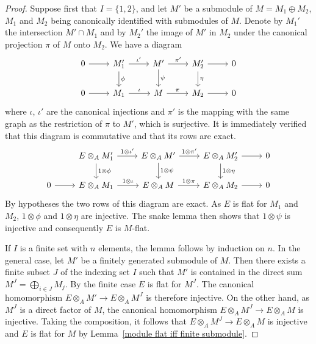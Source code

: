 \begin{proof}
Suppose first that $I=\{1,2\}$, and let $M'$ be a submodule of $M=M_1\oplus M_2$, $M_1$ and $M_2$ being canonically identified with submodules of $M$. Denote by $M_1'$ the intersection $M'\cap M_1$ and by $M_2'$ the image of $M'$ in $M_2$ under the canonical projection $\pi$ of $M$ onto $M_2$. We have a diagram
\[\begin{tikzcd}
0\ar[r]&M_1'\ar[r,"\iota'"]\ar[d,"\phi"]&M'\ar[r,"\pi'"]\ar[d,"\psi"]&M_2'\ar[r]\ar[d,"\eta"]&0\\
0\ar[r]&M_1\ar[r,"\iota"]&M\ar[r,"\pi"]&M_2\ar[r]&0
\end{tikzcd}\]
where $\iota$, $\iota'$ are the canonical injections and $\pi'$ is the mapping with the same graph as the restriction of $\pi$ to $M'$, which is surjective. It is immediately verified that this diagram is commutative and that its rows are exact.
\[\begin{tikzcd}
&E\otimes_AM_1'\ar[r,"1\otimes\iota'"]\ar[d,"1\otimes\phi"]&E\otimes_AM'\ar[r,"1\otimes\pi'"]\ar[d,"1\otimes\psi"]&E\otimes_AM_2'\ar[r]\ar[d,"1\otimes\eta"]&0\\
0\ar[r]&E\otimes_AM_1\ar[r,"1\otimes\iota"]&E\otimes_AM\ar[r,"1\otimes\pi"]&E\otimes_AM_2\ar[r]&0
\end{tikzcd}\]
By hypotheses the two rows of this diagram are exact. As $E$ is flat for $M_1$ and $M_2$, $1\otimes\phi$ and $1\otimes\eta$ are injective. The snake lemma then shows that $1\otimes\psi$ is injective and consequently $E$ is $M$-flat.\par
If $I$ is a finite set with $n$ elements, the lemma follows by induction on $n$. In the general case, let $M'$ be a finitely generated submodule of $M$. Then there exists a finite subset $J$ of the indexing set $I$ such that $M'$ is contained in the direct sum $M^J=\bigoplus_{i\in J}M_j$. By the finite case $E$ is flat for $M^J$. The canonical homomorphism $E\otimes_AM'\to E\otimes_AM^J$ is therefore injective. On the other hand, as $M^J$ is a direct factor of $M$, the canonical homomorphism $E\otimes_AM^J\to E\otimes_AM$ is injective. Taking the composition, it follows that $E\otimes_AM^J\to E\otimes_AM$ is injective and $E$ is flat for $M$ by Lemma~\ref{module flat iff finite submodule}.
\end{proof}
